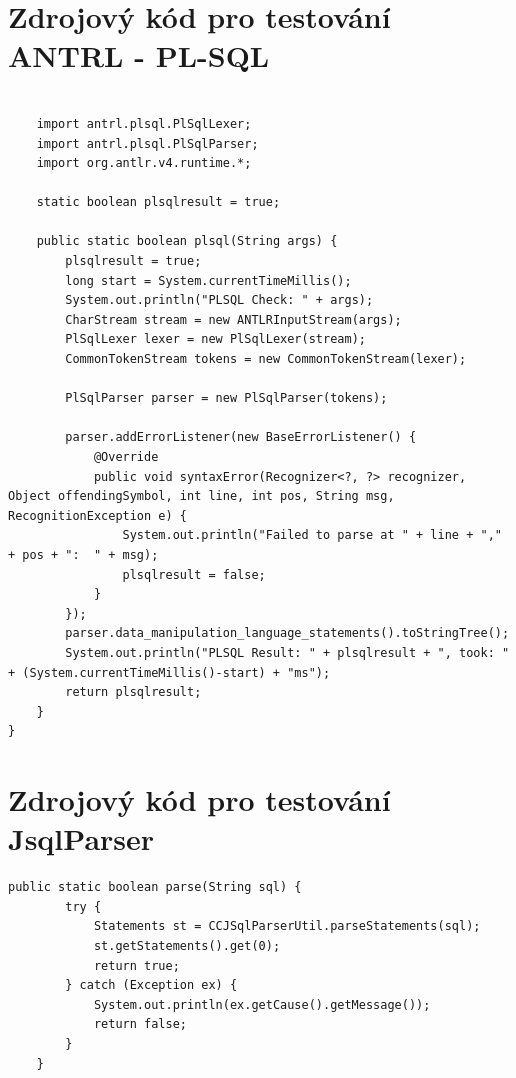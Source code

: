 \documentclass[czech,bachelor,public,dept460,male,cpdeclaration,twoside]{diploma}
\begin{document}
\section{Zdrojový kód pro testování ANTRL - PL-SQL}
\begin{lstlisting}[caption=ANTRL PL-SQL]

	import antrl.plsql.PlSqlLexer;
	import antrl.plsql.PlSqlParser;
	import org.antlr.v4.runtime.*;

    static boolean plsqlresult = true;

    public static boolean plsql(String args) {
        plsqlresult = true;
        long start = System.currentTimeMillis();
        System.out.println("PLSQL Check: " + args);
        CharStream stream = new ANTLRInputStream(args);
        PlSqlLexer lexer = new PlSqlLexer(stream);
        CommonTokenStream tokens = new CommonTokenStream(lexer);

        PlSqlParser parser = new PlSqlParser(tokens);

        parser.addErrorListener(new BaseErrorListener() {
            @Override
            public void syntaxError(Recognizer<?, ?> recognizer, Object offendingSymbol, int line, int pos, String msg, RecognitionException e) {
                System.out.println("Failed to parse at " + line + "," + pos + ":  " + msg);
                plsqlresult = false;
            }
        });
        parser.data_manipulation_language_statements().toStringTree();
        System.out.println("PLSQL Result: " + plsqlresult + ", took: " + (System.currentTimeMillis()-start) + "ms");
        return plsqlresult;
    }
}
\end{lstlisting}


\section{Zdrojový kód pro testování JsqlParser}
\begin{lstlisting}[caption=ANTRL JSQL]
    public static boolean parse(String sql) {
        try {
            Statements st = CCJSqlParserUtil.parseStatements(sql);
            st.getStatements().get(0);
            return true;
        } catch (Exception ex) {
            System.out.println(ex.getCause().getMessage());
            return false;
        }
    }
\end{lstlisting}
\end{document}
